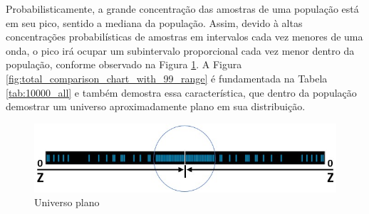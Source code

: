 Probabilisticamente, a grande concentração das amostras de uma população está em seu pico, sentido a mediana da população. Assim, devido à altas concentrações probabilísticas de amostras em intervalos cada vez menores de uma onda, o pico irá ocupar um subintervalo proporcional cada vez menor dentro da população, conforme observado na Figura \ref{fig:consciousness_flat_universe}. A Figura \ref{fig:total_comparison_chart_with_99_range} é fundamentada na Tabela \ref{tab:10000_all} e também demostra essa característica, que dentro da população demostrar um universo aproximadamente plano em sua distribuição.  
	\begin{figure}[H]
	\caption{Universo plano}
	\label{fig:consciousness_flat_universe}
	\centering
	\includegraphics[scale=.6]{sections/images/consciousness_flat_universe.jpg}
	\end{figure}

